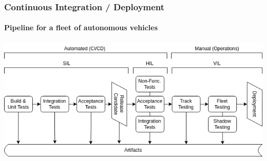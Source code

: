 \begin{frame}
\frametitle{Continuous Integration / Deployment}
\framesubtitle{Pipeline for a fleet of autonomous vehicles}
\includegraphics[width=\textwidth]{images/autonomous_driving_ci-cd_pipeline.png}
\end{frame}


